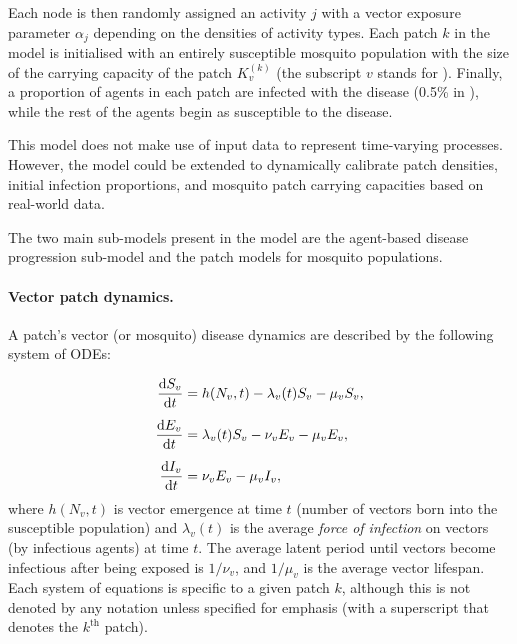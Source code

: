 Each node is then randomly assigned an activity $j$ with a vector exposure parameter $\alpha_{j}$ depending on the densities of activity types. Each patch $k$ in the model is initialised with an entirely susceptible mosquito population with the size of the carrying capacity of the patch $K^{(k)}_v$ (the subscript $v$ stands for ). Finally, a proportion of agents in each patch are infected with the disease (0.5\% in \citet{manore_network-patch_2015}), while the rest of the agents begin as susceptible to the disease.


This model does not make use of input data to represent time-varying processes. However, the model could be extended to dynamically calibrate patch densities, initial infection proportions, and mosquito patch carrying capacities based on real-world data.

\label{oddsec:submodels}


The two main sub-models present in the model are the agent-based disease progression sub-model and the patch models for mosquito populations.

\paragraph{Vector patch dynamics.} A patch's vector (or mosquito) disease dynamics are described by the following system of ODEs:

\begin{equation} \label{eq:mosquito}
\begin{split}
\odv{S_v}{t}&=h(N_v, t)-\lambda_v(t) S_v - \mu_v S_v, \\[5pt]
\odv{E_v}{t}&=\lambda_v(t) S_v - \nu_v E_v - \mu_v E_v, \\[5pt]
\odv{I_v}{t}&=\nu_v E_v - \mu_v I_v,
\end{split}
\end{equation}
where $h(N_v,t)$ is vector emergence at time $t$ (number of vectors born into the susceptible population) and $\lambda_v(t)$ is the average \textit{force of infection} on vectors (by infectious agents) at time $t$. The average latent period until vectors become infectious after being exposed is $1/\nu_v$, and $1/\mu_v$ is the average vector lifespan. Each system of equations is specific to a given patch $k$, although this is not denoted by any notation unless specified for emphasis (with a superscript that denotes the $k^{\text{th}}$ patch).

